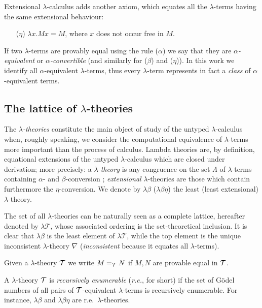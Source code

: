 \documentclass[english]{llncs}
\newcommand{\sqle}{\sqsubseteq}
\newcommand{\LLT}{\lambda\mathscr{T}}\newcommand{\Th}[1]{\mathrm{Th}(#1)} \newcommand{\Thle}[1]{\mathrm{Th_{\sqle}}(#1)} \newcommand{\BTth}{\mathcal{B}}
\newcommand{\cT}{{\cal T}}
\newcommand{\gl}{\lambda}
\begin{document}
Extensional $\lambda$-calculus adds another axiom, which equates all the $\lambda$-terms having the same extensional behaviour:
\begin{itemize}
\item[($\eta$)] $\lambda x.Mx = M$, where $x$ does not occur free in $M$.
\end{itemize}

If two $\lambda$-terms are provably equal using the rule ($\alpha$) we say that they are \emph{$\alpha$-equivalent} or \emph{$\alpha$-convertible} 
(and similarly for ($\beta$) and ($\eta$)).
In this work we identify all $\alpha$-equivalent $\lambda$-terms, thus every $\lambda$-term represents in fact a {\em class} of $\alpha$-equivalent terms. 


\subsection{The lattice of $\lambda$-theories}

The \emph{$\lambda$-theories} constitute the main object of study of the untyped $\gl$-calculus when, roughly speaking, we consider the computational equivalence of $\gl$-terms more important than the process of calculus. 
Lambda theories are, by definition, equational extensions of the untyped $\lambda$-calculus which are closed under derivation; more precisely: 
a {\em $\lambda$-theory} is any congruence on the set $\Lambda$ of $\lambda$-terms containing $\alpha$- and $\beta$-conversion \cite[Def.~4.1.1]{Bare}; 
\emph{extensional} $\lambda$-theories are those which contain furthermore the $\eta$-conversion. 
We denote by $\lambda\beta$ ($\lambda\beta\eta$) the least (least extensional) $\lambda$-theory. 

The set of all $\lambda$-theories can be naturally seen as a complete lattice, hereafter denoted by $\LLT$, whose associated ordering is the set-theoretical inclusion.
It is clear that $\lambda\beta$ is the least element of $\LLT$, while the top element is the unique inconsistent $\lambda$-theory $\nabla$ 
({\em inconsistent} because it equates all $\gl$-terms).

Given a $\lambda$-theory $\cT$ we write $M =_\cT N$ if $M,N$ are provable equal in $\cT$.

A $\lambda$-theory $\cT$ is {\em recursively enumerable} ({\em r.e.}, for short) if the set of G\"odel numbers of all pairs of $\cT$-equivalent $\lambda$-terms
is recursively enumerable. For instance, $\lambda\beta$ and $\lambda\beta\eta$ are r.e.\ $\gl$-theories.
\end{document}
